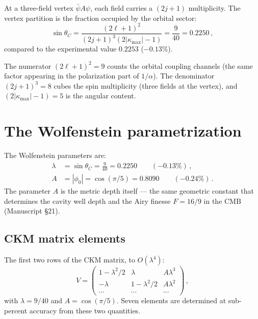 \documentclass[11pt,letterpaper]{article}
\numberwithin{equation}{section}
\begin{document}
At a three-field vertex $\bar{\psi}A\psi$, each field carries a
$(2j+1)$ multiplicity.  The vertex partition is the fraction occupied
by the orbital sector:
\begin{equation}\label{eq:cabibbo}
  \sin\theta_C = \frac{(2\ell+1)^2}{(2j+1)^3(2|\kappa_\mathrm{max}|-1)}
  = \frac{9}{40} = 0.2250\,,
\end{equation}
compared to the experimental value $0.2253$ ($-0.13\%$).

The numerator $(2\ell+1)^2 = 9$ counts the orbital coupling channels
(the same factor appearing in the polarization part of $1/\alpha$).
The denominator $(2j+1)^3 = 8$ cubes the spin multiplicity (three
fields at the vertex), and $(2|\kappa_\mathrm{max}|-1) = 5$ is the
angular content.

\section{The Wolfenstein parametrization}
\label{sec:wolfenstein}

The Wolfenstein parameters are:
\begin{align}
  \lambda &= \sin\theta_C = \frac{9}{40} = 0.2250
    \qquad(-0.13\%)\,, \\
  A &= |\phi_0| = \cos(\pi/5) = 0.8090
    \qquad(-0.24\%)\,.
\end{align}
The parameter $A$ is the metric depth itself --- the same geometric
constant that determines the cavity well depth and the Airy finesse
$F = 16/9$ in the CMB (Manuscript \S21).

\subsection{CKM matrix elements}

The first two rows of the CKM matrix, to $O(\lambda^4)$:
\begin{equation}
  V = \begin{pmatrix}
    1 - \lambda^2/2 & \lambda & A\lambda^3 \\
    -\lambda & 1 - \lambda^2/2 & A\lambda^2 \\
    \cdots & \cdots & \cdots
  \end{pmatrix}\,,
\end{equation}
with $\lambda = 9/40$ and $A = \cos(\pi/5)$.  Seven elements are
determined at sub-percent accuracy from these two quantities.
\end{document}

